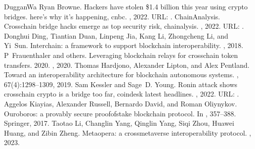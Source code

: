 \documentclass[letterpaper,10pt,english]{jupyterBook}
\begin{document}
\begin{sphinxthebibliography}{DugganWa}
\sphinxAtStartPar
Ryan Browne. Hackers have stolen \$1.4 billion this year using crypto bridges. here’s why it’s happening, cnbc. , 2022. URL: .
\sphinxAtStartPar
ChainAnalysis. Cross\sphinxhyphen{}chain bridge hacks emerge as top security risk, chainalysis. , 2022. URL: .
\sphinxAtStartPar
Donghui Ding, Tiantian Duan, Linpeng Jia, Kang Li, Zhongcheng Li, and Yi Sun. Interchain: a framework to support blockchain interoperability. , 2018.
\sphinxAtStartPar
P Frauenthaler and others. Leveraging blockchain relays for cross\sphinxhyphen{}chain token transfers. 2020. , 2020.
\sphinxAtStartPar
Thomas Hardjono, Alexander Lipton, and Alex Pentland. Toward an interoperability architecture for blockchain autonomous systems. , 67(4):1298–1309, 2019.
\sphinxAtStartPar
Sam Kessler and Sage D. Young. Ronin attack shows cross\sphinxhyphen{}chain crypto is a bridge too far, coindesk latest headlines. , 2022. URL: .
\sphinxAtStartPar
Aggelos Kiayias, Alexander Russell, Bernardo David, and Roman Oliynykov. Ouroboros: a provably secure proof\sphinxhyphen{}of\sphinxhyphen{}stake blockchain protocol. In , 357–388. Springer, 2017.
\sphinxAtStartPar
Taotao Li, Changlin Yang, Qinglin Yang, Siqi Zhou, Huawei Huang, and Zibin Zheng. Metaopera: a cross\sphinxhyphen{}metaverse interoperability protocol. , 2023.

\end{sphinxthebibliography}
\end{document}
